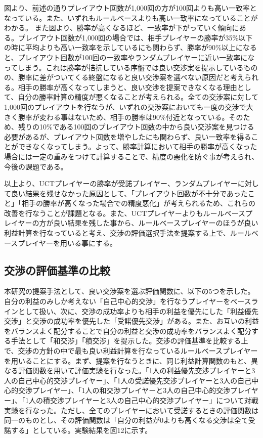 \documentclass[a4, 10pt,dvipdfmx]{jsarticle}
\begin{document}
図より、前述の通りプレイアウト回数が1,000回の方が100回よりも高い一致率となっている。また、いずれもルールベースよりも高い一致率になっていることがわかる。
また図より、勝率が高くなるほど、一致率が下がっていく傾向にある。プレイアウト回数が1,000回の場合では、相手プレイヤーの勝率が35\%以下の時に平均よりも高い一致率を示しているにも関わらず、勝率が90\%以上になると、プレイアウト回数が100回の一致率やランダムプレイヤーに近い一致率になってしまう。これは勝率が拮抗している序盤では良い交渉案を提示しているものの、勝率に差がついてくる終盤になると良い交渉案を選べない原因だと考えられる。相手の勝率が高くなってしまうと、良い交渉を提案できなくなる理由として、自分の勝率計算の精度が悪くなることが考えられる。全ての交渉案に対して1,000回のプレイアウトを行なうが、いずれの交渉案においても一度の交渉で大きく勝率が変わる事はないため、相手の勝率は90\%付近となっている。そのため、残りの10\%である100回のプレイアウト回数の中から良い交渉案を見つける必要があるが、プレイアウト回数を増やしたにも関わらず、良い一致率を得ることができなくなってしまう。よって、勝率計算において相手の勝率が高くなった場合には一定の重みをつけて計算することで、精度の悪化を防ぐ事が考えられ、今後の課題である。

以上より、UCTプレイヤーの勝率が受諾プレイヤー、ランダムプレイヤーに対して良い結果を残せなかった原因として、「プレイアウト回数が不十分であったこと」「相手の勝率が高くなった場合での精度悪化」が考えられるため、これらの改善を行なうことが課題となる。また、UCTプレイヤーよりもルールベースプレイヤーの方が良い結果を残した事から、ルールベースプレイヤーのほうが良い利益計算を行なっていると考え、交渉の評価選択手法を提案する上で、ルールベースプレイヤーを用いる事にする。


\subsection{交渉の評価基準の比較}
本研究の提案手法として、良い交渉案を選ぶ評価関数に、以下の5つを示した。自分の利益のみしか考えない「自己中心的交渉」を行なうプレイヤーをベースラインとして扱い、次に、交渉の成功率よりも相手の利益を優先にした「利益優先交渉」と交渉の成功率を優先した「受諾優先交渉」がある。また、お互いの利益をバランスよく配分することで自分の利益と交渉の成功率をバランスよく配分する手法として「和交渉」「積交渉」を提示した。交渉の評価基準を比較する上で、交渉の方針の中で最も良い利益計算を行なっているルールベースプレイヤーを用いることにする。まず、提案を行なうときに、同じ利益計算関数のもと、異なる評価関数を用いて評価実験を行なった。「1人の利益優先交渉プレイヤーと3人の自己中心的交渉プレイヤー」、「1人の受諾優先交渉プレイヤーと3人の自己中心的交渉プレイヤー」、「1人の和交渉プレイヤーと3人の自己中心的交渉プレイヤー」、「1人の積交渉プレイヤーと3人の自己中心的交渉プレイヤー」について対戦実験を行なった。ただし、全てのプレイヤーにおいて受諾するときの評価関数は同一のものとし、その評価関数は「自分の利益が0よりも高くなる交渉は全て受諾する」としている。実験結果を図12に示す。
\end{document}
